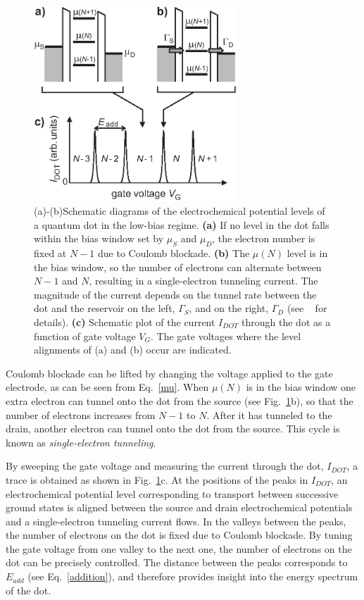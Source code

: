\documentclass[rmp,twocolumn,aps]{revtex4}
\begin{document}
\begin{figure}[htbp]
\includegraphics[width=3in, clip=true]{hanson_fig03.eps}
\caption{(a)-(b)Schematic diagrams of the electrochemical
potential levels of a quantum dot in the low-bias regime.
\textbf{(a)} If no level in the dot falls within the bias window
set by $\mu_S$ and $\mu_D$, the electron number is fixed at
$N\!-\!1$ due to Coulomb blockade. \textbf{(b)} The $\mu(N)$ level
is in the bias window, so the number of electrons can alternate
between $N\!-\!1$ and $N$, resulting in a single-electron
tunneling current. The magnitude of the current depends on the
tunnel rate between the dot and the reservoir on the left,
$\Gamma_{S}$, and on the right, $\Gamma_{D}$ (see
~\textcite{Kouwenhoven97} for details). \textbf{(c)} Schematic
plot of the current $I_{DOT}$ through the dot as a function of
gate voltage $V_G$. The gate voltages where the level alignments
of (a) and (b) occur are indicated. } \label{fig:lowbias}
\end{figure}

Coulomb blockade can be lifted by changing the voltage applied to
the gate electrode, as can be seen from Eq.~\ref{mu}. When
$\mu(N)$ is in the bias window one extra electron can tunnel onto
the dot from the source (see Fig.~\ref{fig:lowbias}b), so that the
number of electrons increases from $N\!-\!1$ to $N$. After it has
tunneled to the drain, another electron can tunnel onto the dot
from the source. This cycle is known as \textit{single-electron
tunneling}.

By sweeping the gate voltage and measuring the current through the dot, $I_{DOT}$, a trace is
obtained as shown in Fig.~\ref{fig:lowbias}c. At the positions of
the peaks in $I_{DOT}$, an electrochemical potential level corresponding to
transport between successive ground states is aligned between the
source and drain electrochemical potentials and a single-electron
tunneling current flows. In the valleys between the peaks, the
number of electrons on the dot is fixed due to Coulomb blockade.
By tuning the gate voltage from one valley to the next one, the
number of electrons on the dot can be precisely controlled. The
distance between the peaks corresponds to $E_{add}$ (see
Eq.~\ref{addition}), and therefore provides insight into the
energy spectrum of the dot.
\end{document}
